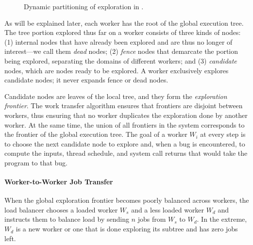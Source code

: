 \begin{figure}[h!]
  \centering
  \caption{Dynamic partitioning of exploration in \cnine.}
 \label{fig:architecture}
\end{figure}

\newcommand{\dead}{dead\xspace}
\newcommand{\fence}{fence\xspace}
\newcommand{\candidate}{candidate\xspace}
\newcommand{\virtual}{virtual\xspace}
\newcommand{\materialized}{materialized\xspace}

As will be explained later, each worker has the root of the global execution tree.  The tree portion explored thus far on a worker consists of three kinds of nodes: (1) internal nodes that have already been explored and are thus no longer of interest---we call them {\em \dead} nodes; (2) {\em \fence} nodes that demarcate the portion being explored, separating the domains of different workers; and (3) {\em \candidate} nodes, which are nodes ready to be explored.  A worker exclusively explores \candidate nodes; it never expands \fence or \dead nodes.

Candidate nodes are leaves of the local tree, and they form the \emph{exploration frontier}.  The work transfer algorithm ensures that frontiers are disjoint between workers, thus ensuring that no worker duplicates the exploration done by another worker.  At the same time, the union of all frontiers in the system corresponds to the frontier of the global execution tree. The goal of a worker  $W_i$ at every step is to choose the next \candidate node to explore and, when a bug is encountered, to compute the inputs, thread schedule, and system call returns that would take the program to that bug.

\paragraph{Worker-to-Worker Job Transfer}
\label{sec:workTransfer}

\newcommand{\wsrc}{\ensuremath{W_s}\xspace}
\newcommand{\wdst}{\ensuremath{W_d}\xspace}

When the global exploration frontier becomes poorly balanced across workers, the load balancer chooses a loaded worker \wsrc and a less loaded worker \wdst  and instructs them to balance load by sending $n$ jobs from \wsrc to \wdst.  In the extreme, \wdst is a new worker or one that is done exploring its subtree and has zero jobs left.  

